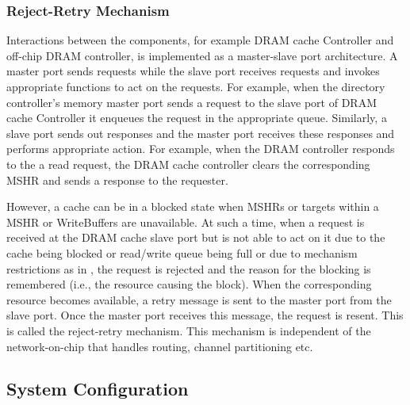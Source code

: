 \subsubsection{Reject-Retry Mechanism} Interactions between the components, for example DRAM cache Controller and off-chip DRAM controller, is implemented as a master-slave port architecture. A master port sends requests while the slave port receives requests and invokes appropriate functions to act on the requests. For example, when the directory controller's memory master port sends a request to the slave port of DRAM cache Controller it enqueues the request in the appropriate queue. Similarly, a slave port sends out responses and the master port receives these responses and performs appropriate action. For example, when the DRAM controller responds to the a read request, the DRAM cache controller clears the corresponding MSHR and sends a response to the requester.
\par However, a cache can be in a blocked state when MSHRs or targets within a MSHR or WriteBuffers are unavailable. At such a time, when a request is received at the DRAM cache slave port but is not able to act on it due to the cache being blocked or read/write queue being full or due to mechanism restrictions as in \prioname, the request is rejected and the reason for the blocking is remembered (i.e., the resource causing the block). When the corresponding resource becomes available, a retry message is sent to the master port from the slave port. Once the master port receives this message, the request is resent. This is called the reject-retry mechanism. This mechanism is independent of the network-on-chip that handles routing, channel partitioning etc.

\subsection{System Configuration} 

